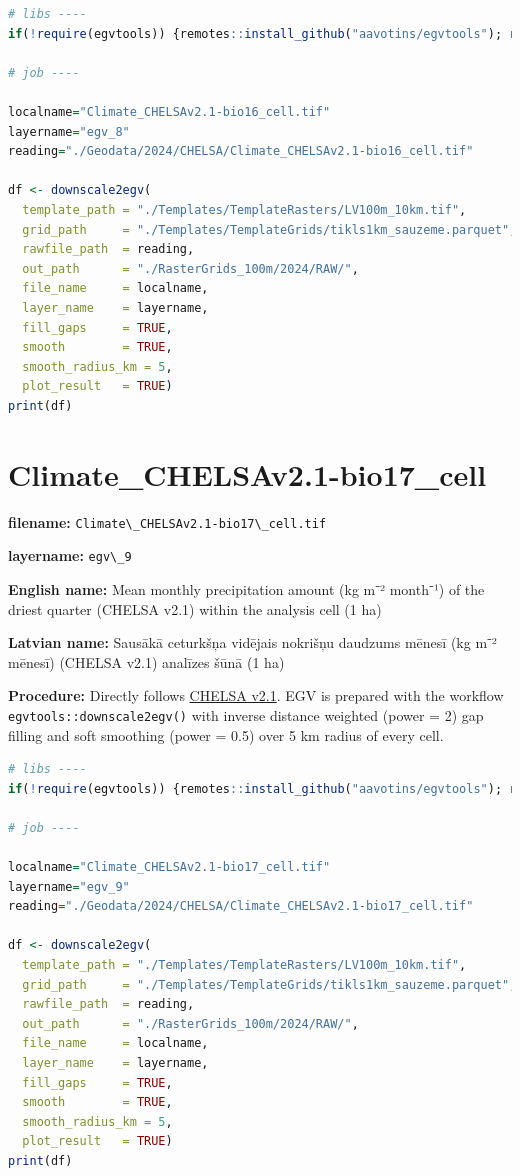 \documentclass[
]{book}
\newcommand{\passthrough}[1]{#1}
\begin{document}
\begin{lstlisting}[language=R]
# libs ----
if(!require(egvtools)) {remotes::install_github("aavotins/egvtools"); require(egvtools)}

# job ----

localname="Climate_CHELSAv2.1-bio16_cell.tif"
layername="egv_8"
reading="./Geodata/2024/CHELSA/Climate_CHELSAv2.1-bio16_cell.tif"

df <- downscale2egv(
  template_path = "./Templates/TemplateRasters/LV100m_10km.tif",
  grid_path     = "./Templates/TemplateGrids/tikls1km_sauzeme.parquet",
  rawfile_path  = reading,
  out_path      = "./RasterGrids_100m/2024/RAW/",
  file_name     = localname,
  layer_name    = layername,
  fill_gaps     = TRUE,
  smooth        = TRUE,
  smooth_radius_km = 5,
  plot_result   = TRUE)
print(df)
\end{lstlisting}

\section{Climate\_CHELSAv2.1-bio17\_cell}\label{ch06.009}

\textbf{filename:} \passthrough{\lstinline!Climate\_CHELSAv2.1-bio17\_cell.tif!}

\textbf{layername:} \passthrough{\lstinline!egv\_9!}

\textbf{English name:} Mean monthly precipitation amount (kg m⁻² month⁻¹) of the driest quarter (CHELSA v2.1) within the analysis cell (1 ha)

\textbf{Latvian name:} Sausākā ceturkšņa vidējais nokrišņu daudzums mēnesī (kg m⁻² mēnesī) (CHELSA v2.1) analīzes šūnā (1 ha)

\textbf{Procedure:} Directly follows \hyperref[Ch04.11]{CHELSA v2.1}. EGV is prepared with the
workflow \passthrough{\lstinline!egvtools::downscale2egv()!} with inverse distance weighted (power = 2)
gap filling and soft smoothing (power = 0.5) over 5 km radius of every cell.

\begin{lstlisting}[language=R]
# libs ----
if(!require(egvtools)) {remotes::install_github("aavotins/egvtools"); require(egvtools)}

# job ----

localname="Climate_CHELSAv2.1-bio17_cell.tif"
layername="egv_9"
reading="./Geodata/2024/CHELSA/Climate_CHELSAv2.1-bio17_cell.tif"

df <- downscale2egv(
  template_path = "./Templates/TemplateRasters/LV100m_10km.tif",
  grid_path     = "./Templates/TemplateGrids/tikls1km_sauzeme.parquet",
  rawfile_path  = reading,
  out_path      = "./RasterGrids_100m/2024/RAW/",
  file_name     = localname,
  layer_name    = layername,
  fill_gaps     = TRUE,
  smooth        = TRUE,
  smooth_radius_km = 5,
  plot_result   = TRUE)
print(df)
\end{lstlisting}
\end{document}
